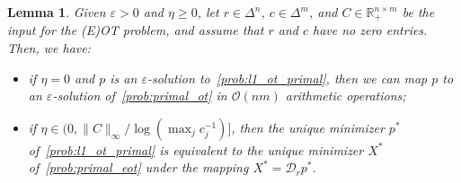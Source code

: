 \documentclass[10pt]{article}
\newcommand{\R}{\mathbb{R}}
\newcommand{\Rp}{\R_{+}}
\newcommand{\diag}[1]{\mathcal{D}_{#1}}
\theoremstyle{plain}
\newtheorem{lemma}[theorem]{Lemma}
\theoremstyle{definition}
\theoremstyle{remark}
\begin{document}
\begin{lemma}\label{lem:l1_prob_equiv}
    Given $\varepsilon>0$ and $\eta \geq 0$, let $r\in\Delta^n$, $c\in \Delta^m$, and $C\in\Rp^{n\times m}$ be the input for the (E)OT problem, and assume that $r$ and $c$ have no zero entries. Then, we have:
    \begin{itemize}
        \item[{a)}] if $\eta =0$ and $p$ is an $\varepsilon$-solution to~\eqref{prob:l1_ot_primal}, then we can map $p$ to an $\varepsilon$-solution of~\eqref{prob:primal_ot} in $\mathcal{O}(nm)$ arithmetic operations;
        \item[{b)}] if $\eta \in(0,\|C\|_\infty/\log(\max_{j}c_j^{-1})]$, then the unique minimizer $p^*$ of~\eqref{prob:l1_ot_primal} is equivalent to the unique minimizer $X^*$ of~\eqref{prob:primal_eot} under the mapping $X^*=\diag{r}p^*$.
    \end{itemize}
\end{lemma}
\end{document}
